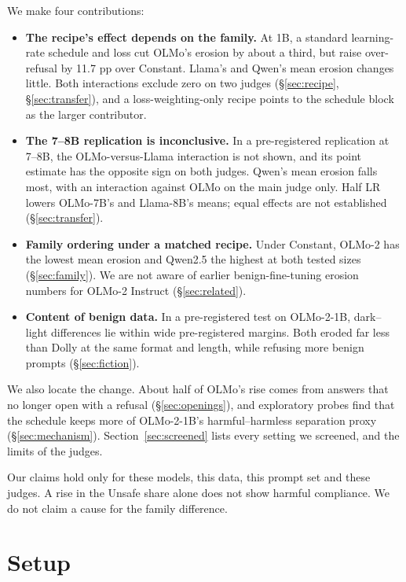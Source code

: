 \documentclass{article}
\begin{document}
We make four contributions:
\begin{itemize}
  \item \textbf{The recipe's effect depends on the family.} At 1B, a standard
        learning-rate schedule and loss cut OLMo's erosion by about a third,
        but raise over-refusal by 11.7 pp over Constant. Llama's and Qwen's
        mean erosion changes little. Both interactions exclude zero on two judges
        (\S\ref{sec:recipe}, \S\ref{sec:transfer}), and a loss-weighting-only
        recipe points to the schedule block as the larger contributor.
  \item \textbf{The 7--8B replication is inconclusive.} In a
        pre-registered replication at 7--8B, the OLMo-versus-Llama interaction
        is not shown, and its point estimate has the opposite sign on both
        judges. Qwen's mean erosion falls most, with an interaction against
        OLMo on the main judge only. Half LR lowers OLMo-7B's and Llama-8B's
        means; equal effects are not established (\S\ref{sec:transfer}).
  \item \textbf{Family ordering under a matched recipe.} Under Constant,
        OLMo-2 has the lowest mean erosion and Qwen2.5 the highest at both
        tested sizes (\S\ref{sec:family}). We are not aware of
        earlier benign-fine-tuning erosion numbers for OLMo-2 Instruct
        (\S\ref{sec:related}).
  \item \textbf{Content of benign data.} In a pre-registered test on
        OLMo-2-1B, dark--light differences lie within wide pre-registered
        margins. Both eroded far less than Dolly at the same format and length, while
        refusing more benign prompts (\S\ref{sec:fiction}).
\end{itemize}

We also locate the change. About half of OLMo's rise comes from answers that no
longer open with a refusal (\S\ref{sec:openings}), and exploratory probes find
that the schedule keeps more of OLMo-2-1B's harmful--harmless separation proxy
(\S\ref{sec:mechanism}). Section~\ref{sec:screened} lists every setting we
screened, and the limits of the judges.

Our claims hold only for these models, this data, this prompt set and these
judges. A rise in the Unsafe share alone does not show harmful compliance. We
do not claim a cause for the family difference.

\section{Setup}
\label{sec:setup}
\end{document}

